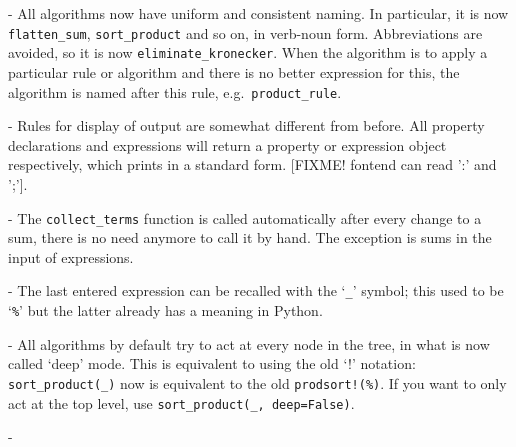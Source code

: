 
- All algorithms now have uniform and consistent naming. In
particular, it is now \verb|flatten_sum|, \verb|sort_product| and so
on, in verb-noun form. Abbreviations are avoided, so it is now
\verb|eliminate_kronecker|. When the algorithm is to apply a
particular rule or algorithm and there is no better expression for
this, the algorithm is named after this rule, e.g.~\verb|product_rule|.

- Rules for display of output are somewhat different from before. All
property declarations and expressions will return a property or
expression object respectively, which prints in a standard form.
[FIXME! fontend can read ':' and ';'].

- The \verb|collect_terms| function is called automatically after
every change to a sum, there is no need anymore to call it by hand.
The exception is sums in the input of expressions.

- The last entered expression can be recalled with the `\verb|_|'
symbol; this used to be `\verb|%|' but the latter already has a
meaning in Python. 

- All algorithms by default try to act at every node in the tree, in
what is now called `deep' mode. This is equivalent to using the old
`!' notation: \verb|sort_product(_)| now is equivalent to the old
\verb|prodsort!(%)|. If you want to only act at the top level, use
\verb|sort_product(_, deep=False)|.

- 


